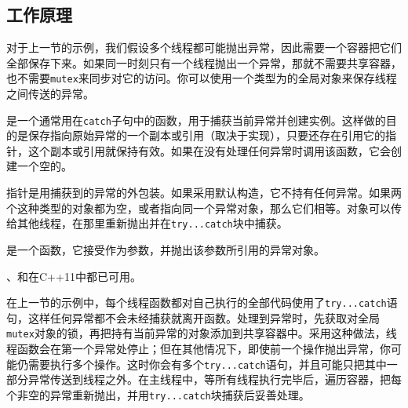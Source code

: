 
\subsection{工作原理}



对于上一节的示例，我们假设多个线程都可能抛出异常，因此需要一个容器把它们全部保存下来。如果同一时刻只有一个线程抛出一个异常，那就不需要共享容器，也不需要\texttt{mutex}来同步对它的访问。你可以使用一个类型为的全局对象来保存线程之间传送的异常。



是一个通常用在\texttt{catch}子句中的函数，用于捕获当前异常并创建实例。这样做的目的是保存指向原始异常的一个副本或引用（取决于实现），只要还存在引用它的指针，这个副本或引用就保持有效。如果在没有处理任何异常时调用该函数，它会创建一个空的。



指针是用捕获到的异常的外包装。如果采用默认构造，它不持有任何异常。如果两个这种类型的对象都为空，或者指向同一个异常对象，那么它们相等。对象可以传给其他线程，在那里重新抛出并在\texttt{try...\allowbreak{}catch}块中捕获。



是一个函数，它接受作为参数，并抛出该参数所引用的异常对象。



\begin{myNote}
、和在C++11中都已可用。
\end{myNote}



在上一节的示例中，每个线程函数都对自己执行的全部代码使用了\texttt{try...\allowbreak{}catch}语句，这样任何异常都不会未经捕获就离开函数。处理到异常时，先获取对全局\texttt{mutex}对象的锁，再把持有当前异常的对象添加到共享容器中。采用这种做法，线程函数会在第一个异常处停止；但在其他情况下，即使前一个操作抛出异常，你可能仍需要执行多个操作。这时你会有多个\texttt{try...\allowbreak{}catch}语句，并且可能只把其中一部分异常传送到线程之外。在主线程中，等所有线程执行完毕后，遍历容器，把每个非空的异常重新抛出，并用\texttt{try...\allowbreak{}catch}块捕获后妥善处理。


